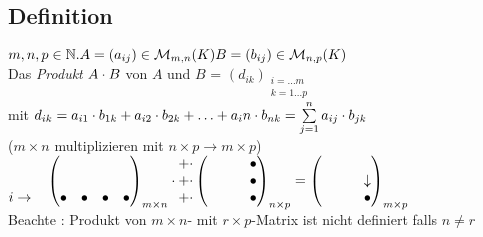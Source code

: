 \subsection{Definition}
$m,n,p \in \mathbb{N}.\\
A = (a_{ij}) \in \mathcal{M}_{m,n}(K)\\
B = (b_{ij}) \in \mathcal{M}_{n,p}(K)\\$\\
Das \emph{Produkt} $A \cdot B$ von $A$ und $B$ = $(d_{ik})_{\substack{i=\ldots m\\k=1\ldots p}}$\\
mit $d_{ik} = a_{i1} \cdot b_{1k} +  a_{i2} \cdot b_{2k} + \ldots +  a_in \cdot b_{nk} = \sum\limits_{j=1}^{n} a_{ij} \cdot b_{jk}$\\
($m \times n$ multiplizieren mit $n \times p\to m \times p$)
\\
$\begin{matrix}
  & \\
  &  \\
 i \to &
\end{matrix}
\begin{pmatrix}
& & &\\
& & &\\
\bullet & \bullet &\bullet & \bullet
\end{pmatrix}_{m \times n} \cdot 
\begin{matrix}
 +\cdot \\
 +\cdot  \\
 +\cdot
\end{matrix}\begin{pmatrix}
& & & \bullet\\
& & & \bullet \\
& & & \bullet
\end{pmatrix}_{n \times p} = \begin{pmatrix}
& & & \\
& & & \downarrow \\
& & & \bullet
\end{pmatrix}_{m \times p}$\\
Beachte : Produkt von $m\times n$- mit $r \times p$-Matrix ist nicht definiert falls $n \ne r$\\
